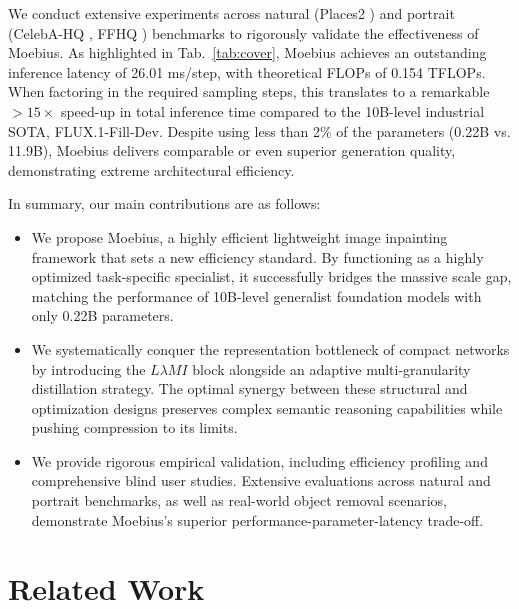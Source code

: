 \documentclass{llmxive}
\begin{document}
\vspace{-0.01em}
We conduct extensive experiments across natural (Places2 \cite{zhou2017places}) and portrait (CelebA-HQ \cite{karras2018celebahq}, FFHQ \cite{karras2018stylegan_ffhq}) benchmarks to rigorously validate the effectiveness of Moebius. As highlighted in Tab.~\ref{tab:cover}, Moebius achieves an outstanding inference latency of 26.01 ms/step, with theoretical FLOPs of 0.154 TFLOPs. When factoring in the required sampling steps, this translates to a remarkable $>15\times$ speed-up in total inference time compared to the 10B-level industrial SOTA, FLUX.1-Fill-Dev. Despite using less than 2\% of the parameters (0.22B vs. 11.9B), Moebius delivers comparable or even superior generation quality, demonstrating extreme architectural efficiency.

\vspace{-0.01em}
In summary, our main contributions are as follows:
\vspace{-0.4em}
\begin{itemize}
    \item We propose Moebius, a highly efficient lightweight image inpainting framework that sets a new efficiency standard. By functioning as a highly optimized task-specific specialist, it successfully bridges the massive scale gap, matching the performance of 10B-level generalist foundation models with only 0.22B parameters.
    \item We systematically conquer the representation bottleneck of compact networks by introducing the $L\lambda MI$ block alongside an adaptive multi-granularity distillation strategy. The optimal synergy between these structural and optimization designs preserves complex semantic reasoning capabilities while pushing compression to its limits.
    \item We provide rigorous empirical validation, including efficiency profiling and comprehensive blind user studies. Extensive evaluations across natural and portrait benchmarks, as well as real-world object removal scenarios, demonstrate Moebius’s superior performance-parameter-latency trade-off.
\end{itemize}

\vspace{-1.2em}
\section{Related Work}\label{sec:related}
\vspace{-0.5em}
\end{document}
